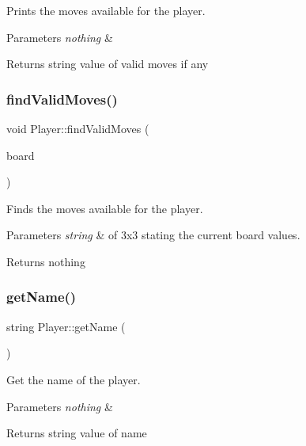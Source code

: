 Prints the moves available for the player. 


\begin{DoxyParams}{Parameters}
{\em nothing} & \\
\hline
\end{DoxyParams}
\begin{DoxyReturn}{Returns}
string value of valid moves if any 
\end{DoxyReturn}
\mbox{\label{classPlayer_affad011a9ad4f41e3ee316bb0be47d10}} 
\subsubsection{\texorpdfstring{find\+Valid\+Moves()}{findValidMoves()}}
{\footnotesize\ttfamily void Player\+::find\+Valid\+Moves (\begin{DoxyParamCaption}\item[{std\+::string}]{board }\end{DoxyParamCaption})}



Finds the moves available for the player. 


\begin{DoxyParams}{Parameters}
{\em string} & of 3x3 stating the current board values. \\
\hline
\end{DoxyParams}
\begin{DoxyReturn}{Returns}
nothing 
\end{DoxyReturn}
\mbox{\label{classPlayer_af9a6045fa96f736664c4eab4caa5e8e5}} 
\subsubsection{\texorpdfstring{get\+Name()}{getName()}}
{\footnotesize\ttfamily string Player\+::get\+Name (\begin{DoxyParamCaption}{ }\end{DoxyParamCaption})}



Get the name of the player. 


\begin{DoxyParams}{Parameters}
{\em nothing} & \\
\hline
\end{DoxyParams}
\begin{DoxyReturn}{Returns}
string value of name 
\end{DoxyReturn}
\mbox{\label{classPlayer_a3e7c5ce7c59c8b5cc9d0b985a1baae91}} 
